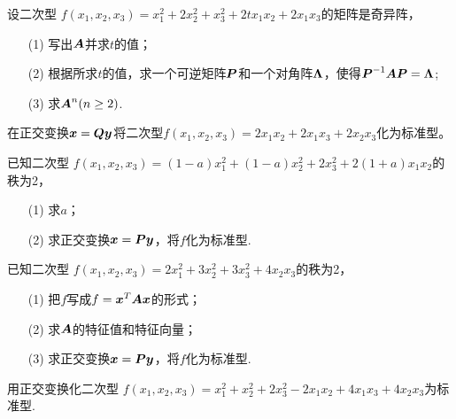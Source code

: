 \begin{frame}
  

  \begin{li}[2010-2011第二学期]
    设二次型
    $
    f(x_1,x_2,x_3)=x_1^2+2x_2^2+x_3^2+2tx_1x_2+2x_1x_3
    $的矩阵是奇异阵，
    \begin{itemize}
    \item[(1)] 写出$\boldsymbol{A}$并求$t$的值；
    \item[(2)] 根据所求$t$的值，求一个可逆矩阵$\boldsymbol{P}$和一个对角阵$\mathbf{\Lambda}$，使得$\boldsymbol{P}^{-1}\boldsymbol{A}\boldsymbol{P}=\mathbf{\Lambda}$;
    \item[(3)] 求$\boldsymbol{A}^n(n\ge 2)$.
    \end{itemize}      
  \end{li}
\end{frame}

\begin{frame}
  \begin{li}[2011-2012第二学期]
    在正交变换${\boldsymbol{x}}=\boldsymbol{Q}{\boldsymbol{y}}$将二次型$f(x_1,x_2,x_3)=2x_1x_2+2x_1x_3+2x_2x_3$化为标准型。
  \end{li}
  
\end{frame}

\begin{frame}
  

  \begin{li}[2012-2013第二学期]
    已知二次型
    $
    f(x_1,x_2,x_3)=(1-a)x_1^2+(1-a)x_2^2+2x_3^2+2(1+a)x_1x_2 
    $的秩为2，
    \begin{itemize}
    \item[(1)] 求$a$；
    \item[(2)] 求正交变换${\boldsymbol{x}}=\boldsymbol{P}{\boldsymbol{y}}$，将$f$化为标准型.
    \end{itemize}      
  \end{li}
\end{frame}

\begin{frame}
  \begin{li}[2012-2013第二学期]
    已知二次型
    $
    f(x_1,x_2,x_3)=2x_1^2+3x_2^2+3x_3^2+4x_2x_3 
    $的秩为2，
    \begin{itemize}
    \item[(1)] 把$f$写成$f={\boldsymbol{x}}^T\boldsymbol{A}{\boldsymbol{x}}$的形式；
    \item[(2)] 求$\boldsymbol{A}$的特征值和特征向量；
    \item[(3)] 求正交变换${\boldsymbol{x}}=\boldsymbol{P}{\boldsymbol{y}}$，将$f$化为标准型.
    \end{itemize}      
  \end{li}
  
\end{frame}

\begin{frame} 
  \begin{li}[2013-2014第一学期]
    用正交变换化二次型
    $
    f(x_1,x_2,x_3)=x_1^2+x_2^2+2x_3^2-2x_1x_2+4x_1x_3+4x_2x_3$为标准型.
  \end{li}  
\end{frame}






